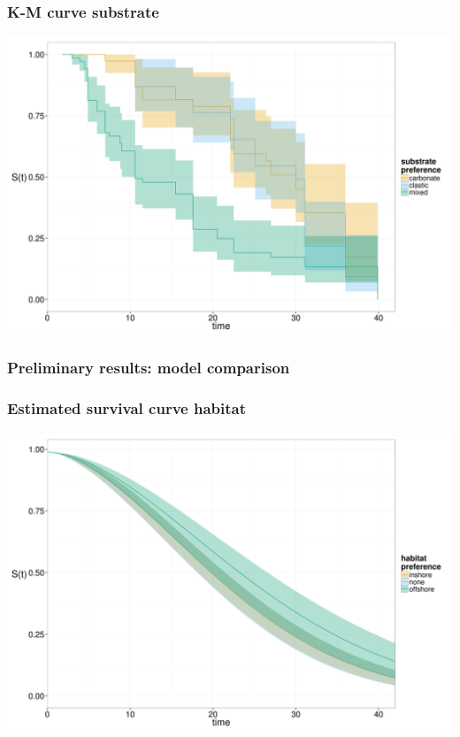 \documentclass{beamer}
\begin{document}
\begin{frame}
  \frametitle{K-M curve substrate}
  \begin{center}
    \includegraphics[height = 0.8\textheight, width = \textwidth, keepaspectratio = true]{figure/km_aff}
  \end{center}
\end{frame}

\begin{frame}
  \frametitle{Preliminary results: model comparison}

  
\end{frame}

\begin{frame}
  \frametitle{Estimated survival curve habitat}
  \begin{center}
    \includegraphics[height = 0.8\textheight, width = \textwidth, keepaspectratio = true]{figure/hab}
  \end{center}
\end{frame}
\end{document}
